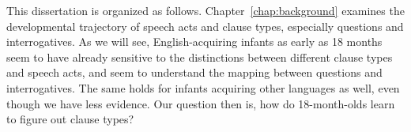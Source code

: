 
This dissertation is organized as follows. Chapter~\ref{chap:background} examines the developmental trajectory of speech acts and clause types, especially questions and interrogatives. As we will see, English-acquiring infants as early as 18 months seem to have already sensitive to the distinctions between different clause types and speech acts, and seem to understand the mapping between questions and interrogatives. The same holds for infants acquiring other languages as well, even though we have less evidence. Our question then is, how do 18-month-olds learn to figure out clause types?

